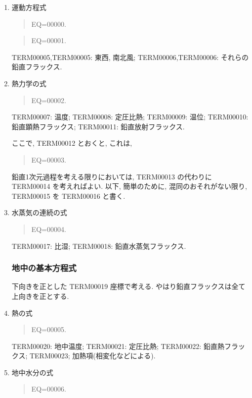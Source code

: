 \begin{enumerate}
\item 運動方程式

\begin{quote}
EQ=00000.
\label{u-eq.orig}
\end{quote}
\begin{quote}
EQ=00001.
\end{quote}

TERM00005,TERM00005: 東西, 南北風; 
TERM00006,TERM00006: それらの鉛直フラックス.

\item 熱力学の式

\begin{quote}
EQ=00002.
\end{quote}

TERM00007: 温度; 
TERM00008: 定圧比熱; 
TERM00009: 温位;
TERM00010: 鉛直顕熱フラックス;
TERM00011: 鉛直放射フラックス.

ここで, TERM00012 とおくと, これは,
\begin{quote}
EQ=00003.
\end{quote}

鉛直1次元過程を考える限りにおいては,
TERM00013 の代わりに TERM00014 を考えればよい.
以下, 簡単のために, 混同のおそれがない限り,
TERM00015 を TERM00016 と書く.

\item 水蒸気の連続の式

\begin{quote}
EQ=00004.
\end{quote}

TERM00017: 比湿; 
TERM00018: 鉛直水蒸気フラックス.

\subsubsection{地中の基本方程式}

下向きを正とした TERM00019 座標で考える. 
やはり鉛直フラックスは全て上向きを正とする.

\item 熱の式

\begin{quote}
EQ=00005.
\end{quote}

TERM00020: 地中温度; TERM00021: 定圧比熱; 
TERM00022: 鉛直熱フラックス;
TERM00023; 加熱項(相変化などによる).

\item 地中水分の式

\begin{quote}
EQ=00006.
\end{quote}


\end{enumerate}

